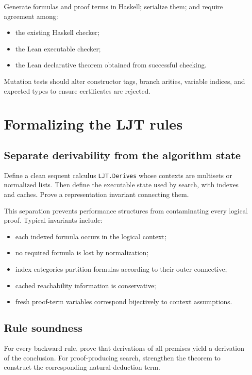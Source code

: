 \documentclass[11pt,letterpaper,openany]{report}
\theoremstyle{definition}
\theoremstyle{remark}
\newcommand{\code}[1]{\texttt{#1}}
\begin{document}
Generate formulas and proof terms in Haskell; serialize them; and require agreement among:

\begin{itemize}
\item the existing Haskell checker;
\item the Lean executable checker;
\item the Lean declarative theorem obtained from successful checking.
\end{itemize}

Mutation tests should alter constructor tags, branch arities, variable indices, and expected types to ensure certificates are rejected.

\section{Formalizing the LJT rules}

\subsection{Separate derivability from the algorithm state}

Define a clean sequent calculus \code{LJT.Derives} whose contexts are multisets or normalized lists. Then define the executable state used by search, with indexes and caches. Prove a representation invariant connecting them.

This separation prevents performance structures from contaminating every logical proof. Typical invariants include:

\begin{itemize}
\item each indexed formula occurs in the logical context;
\item no required formula is lost by normalization;
\item index categories partition formulas according to their outer connective;
\item cached reachability information is conservative;
\item fresh proof-term variables correspond bijectively to context assumptions.
\end{itemize}

\subsection{Rule soundness}

For every backward rule, prove that derivations of all premises yield a derivation of the conclusion. For proof-producing search, strengthen the theorem to construct the corresponding natural-deduction term.
\end{document}
